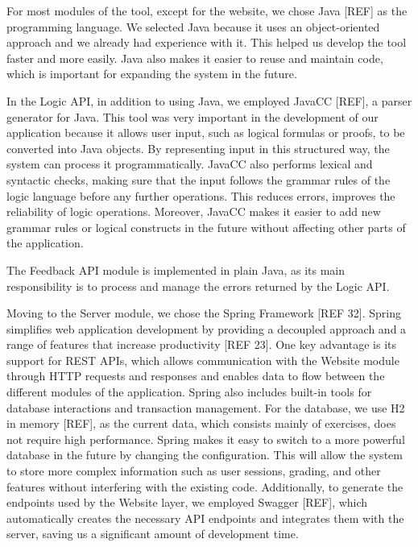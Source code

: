 \vspace{1em}
For most modules of the tool, except for the website, we chose Java [REF] as the programming language. We selected Java because it uses an object-oriented approach and we already had experience with it. This helped us develop the tool faster and more easily. Java also makes it easier to reuse and maintain code, which is important for expanding the system in the future.

In the Logic API, in addition to using Java, we employed JavaCC [REF], a parser generator for Java. This tool was very important in the development of our application because it allows user input, such as logical formulas or proofs, to be converted into Java objects. By representing input in this structured way, the system can process it programmatically. JavaCC also performs lexical and syntactic checks, making sure that the input follows the grammar rules of the logic language before any further operations. This reduces errors, improves the reliability of logic operations. Moreover, JavaCC makes it easier to add new grammar rules or logical constructs in the future without affecting other parts of the application.

The Feedback API module is implemented in plain Java, as its main responsibility is to process and manage the errors returned by the Logic API.

Moving to the Server module, we chose the Spring Framework [REF 32]. Spring simplifies web application development by providing a decoupled approach and a range of features that increase productivity [REF 23]. One key advantage is its support for REST APIs, which allows communication with the Website module through HTTP requests and responses and enables data to flow between the different modules of the application. Spring also includes built-in tools for database interactions and transaction management. For the database, we use H2 in memory [REF], as the current data, which consists mainly of exercises, does not require high performance. Spring makes it easy to switch to a more powerful database in the future by changing the configuration. This will allow the system to store more complex information such as user sessions, grading, and other features without interfering with the existing code. Additionally, to generate the endpoints used by the Website layer, we employed Swagger [REF], which automatically creates the necessary API endpoints and integrates them with the server, saving us a significant amount of development time.

